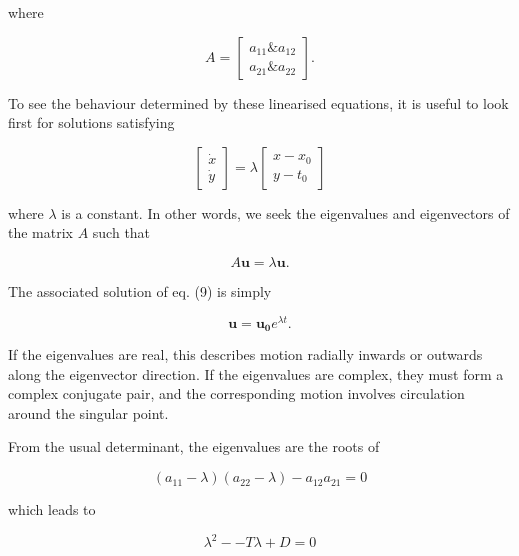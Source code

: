   \noindent{}where 

  \begin{equation*}A=\begin{bmatrix} a_{11} \& a_{12}\\a_{21} \& a_{22} 
  \end{bmatrix} . \tag{8}\end{equation*} 

  To see the behaviour determined by these linearised equations, it is useful 
  to look first for solutions satisfying 

  \begin{equation*}\begin{bmatrix} \dot{x} \\ \dot{y} \end{bmatrix} = \lambda 
  \begin{bmatrix} x-x_0 \\ y-t_0 \end{bmatrix} \tag{9}\end{equation*} 

  \noindent{}where $\lambda$ is a constant. In other words, we seek the 
  eigenvalues and eigenvectors of the matrix $A$ such that 

  \begin{equation*}A \mathbf{u} = \lambda \mathbf{u} . \tag{10}\end{equation*} 

  The associated solution of eq. (9) is simply 

  \begin{equation*}\mathbf{u} = \mathbf{u_0} e^{\lambda t} . 
  \tag{11}\end{equation*} 

  If the eigenvalues are real, this describes motion radially inwards or 
  outwards along the eigenvector direction. If the eigenvalues are complex, 
  they must form a complex conjugate pair, and the corresponding motion 
  involves circulation around the singular point. 

  From the usual determinant, the eigenvalues are the roots of 

  \begin{equation*}(a_{11}-\lambda)(a_{22}-\lambda)-a_{12} a_{21} =0 
  \tag{12}\end{equation*} 

  \noindent{}which leads to 

  \begin{equation*}\lambda^2 -- T \lambda +D =0 \tag{13}\end{equation*} 

